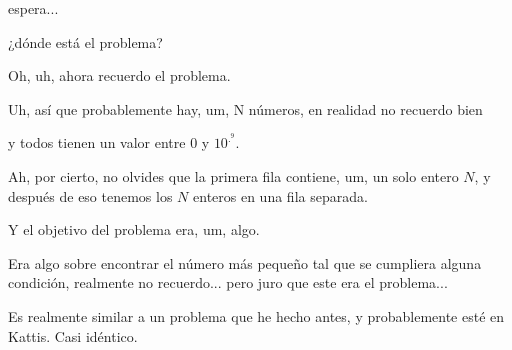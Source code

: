 \noindent
espera...

¿dónde está el problema?


\newpage
\vspace{90 cm}

Oh, uh, ahora recuerdo el problema.

Uh, así que probablemente hay, um, N números, en realidad no recuerdo bien

y todos tienen un valor entre 0 y $10^{.^9}$.

Ah, por cierto, no olvides que la primera fila contiene, um, un solo entero $N$, y después de eso tenemos los $N$ enteros en una fila separada.

Y el objetivo del problema era, um, algo.

Era algo sobre encontrar el número más pequeño tal que se cumpliera alguna condición, realmente no recuerdo... pero juro que este era el problema...


\newpage
\vspace{90 cm}
Es realmente similar a un problema que he hecho antes, y probablemente esté en Kattis. Casi idéntico.



